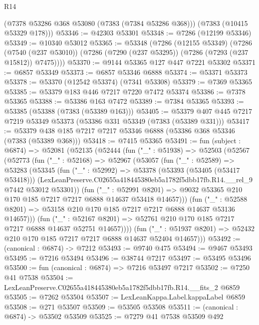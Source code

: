 \begin{lexlean}{R14}
\begin{coremodule}
      (@7378 @53286 @368 @53080 (@7383 (@7384 @53286 @368)))
      (@7383 (@10415 @53329 @178)))
@53346 := @42303 @53301
@53348 := @7286 (@12199 @53346)
@53349 := @10340 @53012
@53365 := @53348
    (@7286
      (@12155 @53349)
      (@7286
        (@7540 (@237 @53010))
        (@7286 (@7290 (@237 @53295)) (@7286 (@7293 (@237 @15812)) @7475))))
@53370 := @9144 @53365 @127 @447 @7221 @53302
@53371 := @6857 @53349
@53373 := @6857 @53346 @6888
@53374 := @53371 @53373
@53378 := @53370 (@12542 @53374) (@7341 @53308)
@53379 := @7369 @53365
@53385 := @53379 @183 @446 @7217 @7220 @7472 @53374
@53386 := @7378 @53365
@53388 := @53386 @163 @7472
@53389 := @7384 @53365
@53393 := @53385 (@53388 (@7383 (@53389 @163)))
@53405 := @53379 @407 @445 @7217 @7219 @53349 @53373 (@53386 @331 @53349 (@7383 (@53389 @331)))
@53417 := @53379 @438 @185 @7217 @7217 @53346 @6888 (@53386 @368 @53346 (@7383 (@53389 @368)))
@53418 := @7415 @53365
@53491 := fun (subject : @6874) =>
  @52081
    (@52135
      (@52444
        (fun ("_" : @51938) =>
        @52503
          (@52567
            (@52773
              (fun ("_" : @52168) =>
              @52967
                (@53057
                  (fun ("_" : @52589) =>
                  @53283
                    (@53345
                      (fun ("_" : @52992) =>
                      @53378
                        (@53393 (@53405 (@53417 @53418)))
                        (LexLeanPreserve.C02655a418445380eb5a1782f5dbb17fb.R14.__rel_9
                          @7442
                          @53012
                          @53301))
                      (fun ("_" : @52991 @8201) =>
                      @9032 @53365 @210 @170 @185 @7217 @7217 @6888 @14637 @53418 @14657)))
                  (fun ("_" : @52588 @8201) =>
                  @53158 @210 @170 @185 @7217 @7217 @6888 @14637 @53136 @14657)))
              (fun ("_" : @52167 @8201) =>
              @52761 @210 @170 @185 @7217 @7217 @6888 @14637 @52751 @14657))))
        (fun ("_" : @51937 @8201) => @52432 @210 @170 @185 @7217 @7217 @6888 @14637 @52404 @14657)))
@53492 := (canonical : @6874) -> @7212
@53493 := @9740 @475
@53494 := @9467 @53493
@53495 := @7216 @53494
@53496 := @38744 @7217
@53497 := @53495 @53496
@53500 := fun (canonical : @6874) => @7216 @53497 @7217
@53502 := @7250 @41 @7538
@53504 := LexLeanPreserve.C02655a418445380eb5a1782f5dbb17fb.R14.__fits_2 @6859
@53505 := @7262 @53504
@53507 := LexLeanKappa.Label.kappaLabel @6859
@53508 := @271 @53507
@53509 := @53505 @53508
@53511 := (canonical : @6874) -> @53502 @53509
@53525 := @7279
    @41
    @7538
    @53509
    @492

\end{coremodule}
\end{lexlean}
